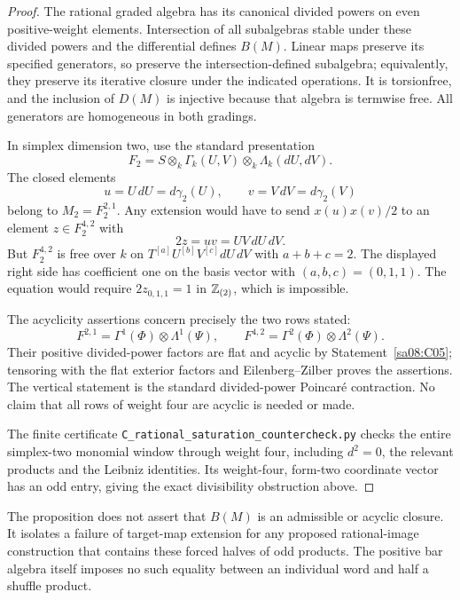 \begin{proof}
The rational graded algebra has its canonical divided powers on
even positive-weight elements. Intersection of all subalgebras stable
under these divided powers and the differential defines $B(M)$.
Linear maps preserve its specified generators, so preserve the
intersection-defined subalgebra; equivalently, they preserve its
iterative closure under the indicated operations. It is torsionfree,
and the inclusion of $D(M)$ is injective because that algebra is
termwise free. All generators are homogeneous in both gradings.

In simplex dimension two, use the standard presentation
\[
 F_2=S\otimes_k\Gamma_k(U,V)\otimes_k\Lambda_k(dU,dV).
\]
The closed elements
\[
 u=U\,dU=d\gamma_2(U),\qquad
 v=V\,dV=d\gamma_2(V)
\]
belong to $M_2=F_2^{2,1}$. Any extension would have to send
$x(u)x(v)/2$ to an element $z\in F_2^{4,2}$ with
\[
 2z=uv=UV\,dU\,dV.
\]
But $F_2^{4,2}$ is free over $k$ on
$T^{[a]}U^{[b]}V^{[c]}dU\,dV$ with $a+b+c=2$.
The displayed right side has coefficient one on the basis vector
with $(a,b,c)=(0,1,1)$. The equation would require $2z_{0,1,1}=1$
in $\mathbb Z_{(2)}$, which is impossible.

The acyclicity assertions concern precisely the two rows stated:
\[
 F^{2,1}=\Gamma^1(\Phi)\otimes\Lambda^1(\Psi),\qquad
 F^{4,2}=\Gamma^2(\Phi)\otimes\Lambda^2(\Psi).
\]
Their positive divided-power factors are flat and acyclic by
Statement~\ref{sa08:C05}; tensoring with the flat exterior factors
and Eilenberg--Zilber proves the assertions. The vertical statement
is the standard divided-power Poincar\'e contraction. No claim that
all rows of weight four are acyclic is needed or made.

The finite certificate \texttt{C\_rational\_saturation\_countercheck.py}
checks the entire simplex-two monomial window through weight four,
including $d^2=0$, the relevant products and the Leibniz identities.
Its weight-four, form-two coordinate vector has an odd entry, giving
the exact divisibility obstruction above.
\end{proof}

The proposition does not assert that $B(M)$ is an admissible or
acyclic closure. It isolates a failure of target-map extension for
any proposed rational-image construction that contains these forced
halves of odd products. The positive bar algebra itself imposes no
such equality between an individual word and half a shuffle product.
